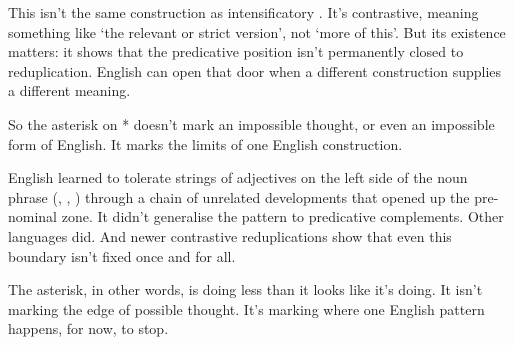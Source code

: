 This isn't the same construction as intensificatory . It's contrastive, meaning something like `the relevant or strict version', not `more of this'. But its existence matters: it shows that the predicative position isn't permanently closed to reduplication. English can open that door when a different construction supplies a different meaning.

\bigskip

So the asterisk on * doesn't mark an
impossible thought, or even an impossible form of English. It marks the
limits of one English construction.

English learned to tolerate strings of adjectives on the left side of the
noun phrase (, ,
) through a chain of unrelated
developments that opened up the pre-nominal zone. It didn't generalise
the pattern to predicative complements. Other languages did. And newer
contrastive reduplications show that even this boundary isn't fixed once
and for all.

The asterisk, in other words, is doing less than it looks like it's
doing. It isn't marking the edge of possible thought. It's marking where
one English pattern happens, for now, to stop.




